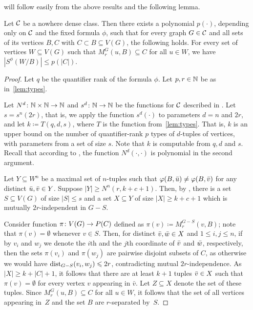  will follow easily from the above results and the following lemma.

\begin{lemma}\label{lem:num-types-same-class}
Let $\mathcal{C}$ be a nowhere dense class.
Then there exists a polynomial $p(\cdot)$, depending only on $\mathcal{C}$ and the fixed formula $\phi$, such that for every graph $G\in\mathcal{C}$ and all sets of its vertices $B,C$ with
$C\subset B\subseteq V(G)$, the following holds.
For every set of vertices $W\subseteq V(G)$ such that 
$M_r^G(u,B)\subseteq C$ for all $u\in W$, 
we have $|S^\phi(W/B)|\le p(|C|)$.
\end{lemma}
\begin{proof}
Let $q$ be the quantifier rank of the formula $\phi$.
Let $p,r\in \mathbb{N}$ be as in~\cref{lem:types}.

Let $N^d\colon \mathbb{N}\times\mathbb{N}\to\mathbb{N}$ and $s^d\colon \mathbb{N}\to\mathbb{N}$ be
the functions for $\mathcal{C}$ described in . 
Let $s=s^n(2r)$, that is, we apply the function $s^d(\cdot)$ to
parameters $d=n$ and $2r$, and let $k\coloneqq T(q,d,s)$,
where $T$ is the function from~\cref{lem:types}.
That is, $k$ is an upper bound on the number 
of quantifier-rank $p$ types of $d$-tuples of vertices, with parameters from a set of size $s$.
Note that  $k$ is computable from $q,d$ and $s$.
 Recall that according
to , the function $N^d(\cdot,\cdot)$ is polynomial in the second
argument. 

Let $Y\subseteq W^n$ be a maximal set of $n$-tuples 
such that $\varphi(B,\bar{u})\neq \varphi(B,\bar{v})$ 
for any distinct $\bar{u}, \bar{v}\in Y$.
Suppose $|Y|\geq N^n(r,k+c+1)$. Then, by , there is a  
set $S\subseteq V(G)$ of size $|S|\leq s$ 
and a set $X\subseteq Y$ of size $|X|\geq k+c+1$ which is 
mutually $2r$-independent in $G-S$. 

Consider function $\pi\colon V(G)\to P(C)$
defined as
 $\pi(v)\coloneqq M_r^{G-S}(v,B)$; note that $\pi(v)=\emptyset$ whenever $v\in S$.
 Then, for distinct $\bar{v},\bar{w}\in X$
 and $1\leq i,j\leq n$, if by $v_i$ and $w_j$ we denote the $i$th and the $j$th coordinate of $\bar{v}$ and $\bar{w}$, respectively, then 
 the sets $\pi(v_i)$ and $\pi(w_j)$ are pairwise disjoint subsets of $C$,
as otherwise we would have \mbox{$\mathrm{dist}_{G-S}(v_i,w_j)\leqslant 2r$},
contradicting mutual $2r$-independence.
As  $|X|\ge k+|C|+1$, it follows that 
there are at least $k+1$ tuples $\bar{v}\in X$
such that  $\pi(v)=\emptyset$ for every vertex $v$ appearing in $\bar v$. Let $Z\subseteq X$ denote the set of these tuples. Since
$M_r^G(u,B)\subseteq C$ for all $u\in W$, it follows that the set of all vertices appearing in~$Z$ and the
set $B$ are $r$-separated by~$S$.


\end{proof}
